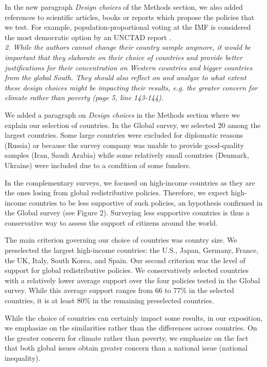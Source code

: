 \documentclass[12pt,english]{article}
\begin{document}
In the new paragraph \textit{Design choices} of the Methods section, we also added references to scientific articles, books or reports which propose the policies that we test. For example, population-proportional voting at the IMF is considered the most democratic option by an UNCTAD report \citep{woodward_imf_2007}.
~\\

\textit{2. While the authors cannot change their country sample anymore, it would be important that they elaborate on their choice of countries and provide better justifications for their concentration on Western countries and bigger countries from the global South. They should also reflect on and analyze to what extent these design choices might be impacting their results, e.g. the greater concern for climate rather than poverty (page 5, line 143-144).}

We added a paragraph on \textit{Design choices} in the Methods section where we explain our selection of countries. In the Global survey, we selected 20 among the largest countries. Some large countries were excluded for diplomatic reasons (Russia) or because the survey company was unable to provide good-quality samples (Iran, Saudi Arabia) while some relatively small countries (Denmark, Ukraine) were included due to a condition of some funders.

In the complementary surveys, we focused on high-income countries as they are the ones losing from global redistributive policies. Therefore, we expect high-income countries to be less supportive of such policies, an hypothesis confirmed in the Global survey (see Figure 2). Surveying less supportive countries is thus a conservative way to assess the support of citizens around the world. 

The main criterion governing our choice of countries was country size. We preselected the largest high-income countries: the U.S., Japan, Germany, France, the UK, Italy, South Korea, and Spain. Our second criterion was the level of support for global redistributive policies. We conservatively selected countries with a relatively lower average support over the four policies tested in the Global survey. While this average support ranges from 66 to 77\% in the selected countries, it is at least 80\% in the remaining preselected countries.

While the choice of countries can certainly impact some results, in our exposition, we emphasize on the similarities rather than the differences across countries. On the greater concern for climate rather than poverty, we emphasize on the fact that both global issues obtain greater concern than a national issue (national inequality). 
~\\
\end{document}
